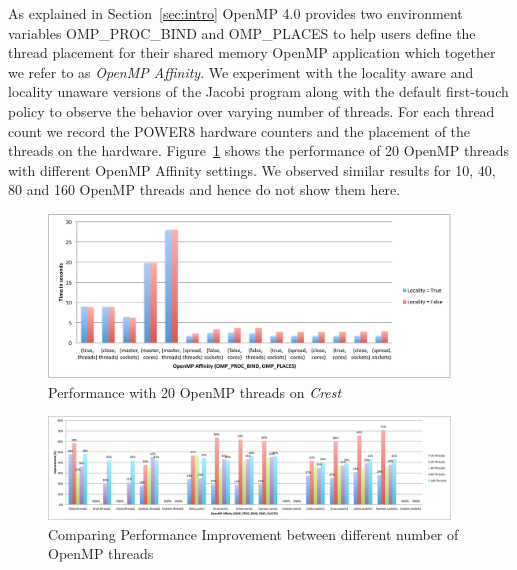 As explained in Section~\ref{sec:intro} OpenMP 4.0 provides two environment variables OMP\_PROC\_BIND and OMP\_PLACES to help users define the thread placement for their shared memory OpenMP application which together we refer to as \textit{OpenMP Affinity}.%
%
 We experiment with the locality aware and locality unaware versions of the Jacobi program along with the default first-touch policy to observe the behavior over varying number of threads. 
 For each thread count we record the POWER8 hardware counters and the placement of the threads on the hardware. 
 Figure~\ref{fig:20th} shows the performance of 20 OpenMP threads with different OpenMP Affinity settings. We observed similar results for 10, 40, 80 and 160 OpenMP threads and hence do not show them here.
%
\begin{figure}[h!]
  \centering
  \includegraphics[height=0.4\textwidth, width=0.95\textwidth]{./Images/20Perf.pdf}
       \caption{Performance with 20 OpenMP threads on \textit{Crest}}
       \label{fig:20th}
\end{figure}
%
\begin{figure}[h!]
  \centering
  \includegraphics[height=0.4\textwidth, width=0.95\textwidth]{./Images/ImpAll.pdf}
       \caption{Comparing Performance Improvement between different number of OpenMP threads}
       \label{fig:imp}
\end{figure}
